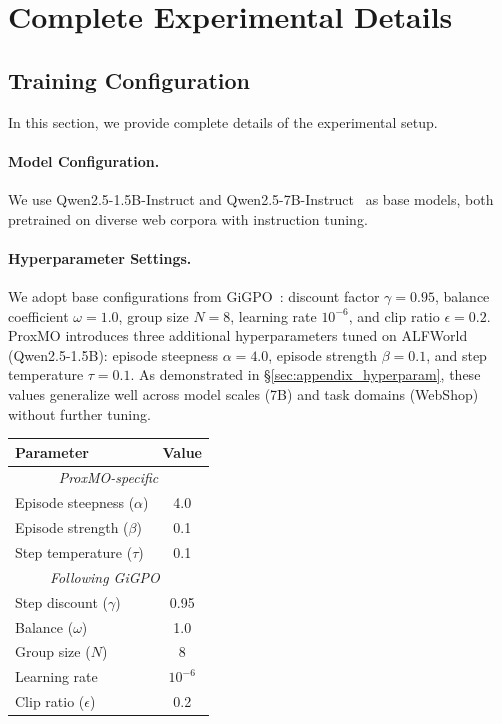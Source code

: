 \documentclass[11pt]{article}
\begin{document}
\section{Complete Experimental Details}
\label{sec:appendix_experiments}

\subsection{Training Configuration}
\label{sec:appendix_training}

In this section, we provide complete details of the experimental setup.

\paragraph{Model Configuration.}
We use Qwen2.5-1.5B-Instruct and Qwen2.5-7B-Instruct~\cite{qwen2025qwen24technicalreport} 
as base models, both pretrained on diverse web corpora with instruction tuning.

\paragraph{Hyperparameter Settings.}
We adopt base configurations from GiGPO~\cite{feng2025group}: discount factor 
$\gamma=0.95$, balance coefficient $\omega=1.0$, group size $N=8$, learning 
rate $10^{-6}$, and clip ratio $\epsilon=0.2$. ProxMO introduces three additional 
hyperparameters tuned on ALFWorld (Qwen2.5-1.5B): episode steepness $\alpha=4.0$, 
episode strength $\beta=0.1$, and step temperature $\tau=0.1$. As demonstrated 
in §\ref{sec:appendix_hyperparam}, these values generalize well across model 
scales (7B) and task domains (WebShop) without further tuning.

\begin{table}[h]
\centering
\small
\begin{tabular}{lc}
\toprule
\textbf{Parameter} & \textbf{Value} \\
\midrule
\multicolumn{2}{c}{\textit{ProxMO-specific}} \\
Episode steepness ($\alpha$) & 4.0 \\
Episode strength ($\beta$) & 0.1 \\
Step temperature ($\tau$) & 0.1 \\
\midrule
\multicolumn{2}{c}{\textit{Following GiGPO~\cite{feng2025group}}} \\
Step discount ($\gamma$) & 0.95 \\
Balance ($\omega$) & 1.0 \\
Group size ($N$) & 8 \\
Learning rate & $10^{-6}$ \\
Clip ratio ($\epsilon$) & 0.2 \\
\bottomrule
\end{tabular}
\end{table}
\end{document}
